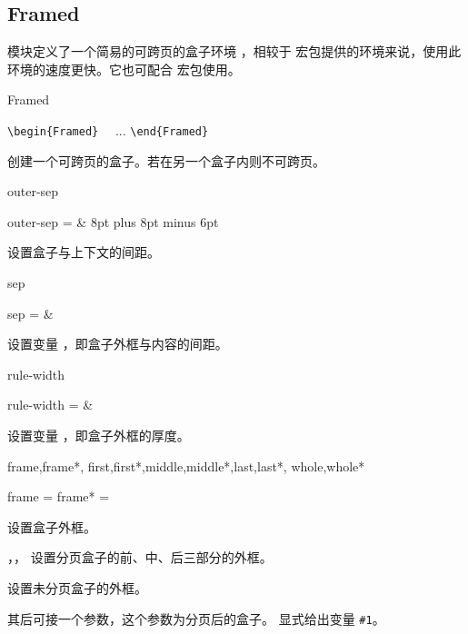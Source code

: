 \documentclass{cusdoc}
\begin{document}
\subsection{Framed}

 模块定义了一个简易的可跨页的盒子环境 ，相较于 
 宏包提供的环境来说，使用此环境的速度更快。它也可配合 
宏包使用。

\begin{function}[type=environment]{Framed}
  \begin{syntax}
    \verb|\begin{Framed}| 
    ~~... 
    \verb|\end{Framed}|
  \end{syntax}
创建一个可跨页的盒子。若在另一个盒子内则不可跨页。
\end{function}

\begin{keyval}[path=frame]{outer-sep}
  \begin{syntax}
    outer-sep =  & 8pt plus 8pt minus 6pt 
  \end{syntax}
设置盒子与上下文的间距。
\end{keyval}

\begin{keyval}[path=frame]{sep}
  \begin{syntax}
    sep =  & \V{3\fboxsep}
  \end{syntax}
设置变量 ，即盒子外框与内容的间距。
\end{keyval}

\begin{keyval}[path=frame]{rule-width}
  \begin{syntax}
    rule-width =  & \V\fboxrule
  \end{syntax}
设置变量 ，即盒子外框的厚度。
\end{keyval}

\begin{keyval}[path=frame]{frame,frame*,
  first,first*,middle,middle*,last,last*,
  whole,whole*}
  \begin{syntax}
    frame  = 
    frame* = 
  \end{syntax}
 设置盒子外框。

，， 设置分页盒子的前、中、后三部分的外框。

 设置未分页盒子的外框。

 其后可接一个参数，这个参数为分页后的盒子。
 显式给出变量 \verb|#1|。
\end{keyval}
\end{document}

